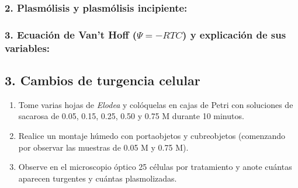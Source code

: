 \documentclass[
  spanish,
  10pt,
  letterpaper,
  twocolumn]{article}
\providecommand{\tightlist}{%
  \setlength{\itemsep}{0pt}\setlength{\parskip}{0pt}}
\begin{document}
\hrulefill

\hrulefill

\hrulefill

\hrulefill

\hrulefill

\subsubsection{2. Plasmólisis y plasmólisis
incipiente:}\label{plasmuxf3lisis-y-plasmuxf3lisis-incipiente}

\hrulefill

\hrulefill

\hrulefill

\hrulefill

\hrulefill

\subsubsection{\texorpdfstring{3. Ecuación de Van't Hoff
(\(\Psi = -RTC\)) y explicación de sus
variables:}{3. Ecuación de Van't Hoff (\textbackslash Psi = -RTC) y explicación de sus variables:}}\label{ecuaciuxf3n-de-vant-hoff-psi--rtc-y-explicaciuxf3n-de-sus-variables}

\hrulefill

\hrulefill

\hrulefill

\hrulefill

\hrulefill

\subsection{3. Cambios de turgencia
celular}\label{cambios-de-turgencia-celular}

\begin{enumerate}
\def\labelenumi{\arabic{enumi}.}
\tightlist
\item
  Tome varias hojas de \emph{Elodea} y colóquelas en cajas de Petri con
  soluciones de sacarosa de 0.05, 0.15, 0.25, 0.50 y 0.75 M durante 10
  minutos.
\item
  Realice un montaje húmedo con portaobjetos y cubreobjetos (comenzando
  por observar las muestras de 0.05 M y 0.75 M).
\item
  Observe en el microscopio óptico 25 células por tratamiento y anote
  cuántas aparecen turgentes y cuántas plasmolizadas.
\end{enumerate}

\begin{center}
\end{center}
\end{document}
